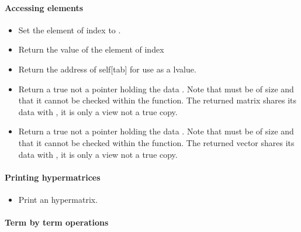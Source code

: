\paragraph{Accessing elements}

\begin{itemize}
\item   {}
  \sshortdescribe Set the element of index  to .
  
\item {}
  \sshortdescribe Return the value of the element of index  
  
\item {}
  \sshortdescribe Return the address of self[tab] for use as a lvalue.  

\item {}
  \sshortdescribe Return a true \PnlMat not a pointer holding the data
  . Note that  must be of size  and that it
  cannot be checked within the function. The returned matrix shares its data
  with , it is only a view not a true copy.

\item {}
  \sshortdescribe Return a true \PnlVect not a pointer holding the data
  . Note that  must be of size  and that it
  cannot be checked within the function. The returned vector shares its data
  with , it is only a view not a true copy.


\end{itemize}  

\paragraph{Printing hypermatrices}

\begin{itemize}
\item {}
  \sshortdescribe Print an hypermatrix.
\end{itemize}

\paragraph{Term by term operations}

